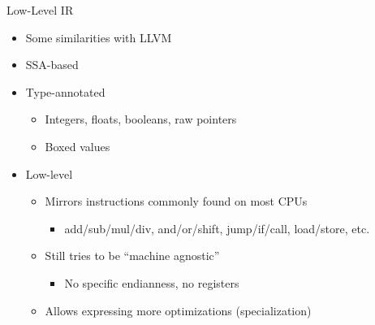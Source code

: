 \begin{frame}{Low-Level IR}
    \begin{itemize}
        \item Some similarities with LLVM
        \item SSA-based
        \item Type-annotated
        \begin{itemize}
            \item Integers, floats, booleans, raw pointers
            \item Boxed values
        \end{itemize}
        \item Low-level
        \begin{itemize}
            \item Mirrors instructions commonly found on most CPUs
            \begin{itemize}
                \item add/sub/mul/div, and/or/shift, jump/if/call, load/store, etc.
            \end{itemize}
            \item Still tries to be “machine agnostic”
            \begin{itemize}
                \item No specific endianness, no registers
            \end{itemize}
            \item Allows expressing more optimizations (specialization)
        \end{itemize}
    \end{itemize}
\end{frame}

\begin{frame}{}

\end{frame}

\begin{frame}{}

\end{frame}

